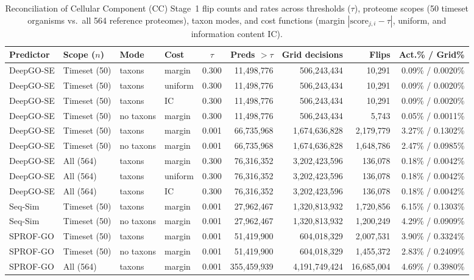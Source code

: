 \begin{table}[!h]
\centering
\caption{Reconciliation of Cellular Component (CC) Stage~1 flip counts and rates across thresholds ($\tau$), proteome scopes (50 timeset organisms vs.\ all 564 reference proteomes), taxon modes, and cost functions (margin $|\text{score}_{j,i}-\tau|$, uniform, and information content IC).}
\label{tab:supp-reconcile}
\scriptsize
\setlength{\tabcolsep}{3.5pt}
\renewcommand{\arraystretch}{0.94}
\begin{tabular}{llllc rrrr}
\toprule
Predictor & Scope ($n$) & Mode & Cost & $\tau$ & Preds $>\tau$ & Grid decisions & Flips & Act.\% / Grid\% \\
\midrule
DeepGO-SE & Timeset (50) & taxons    & margin  & 0.300 & 11{,}498{,}776 &   506{,}243{,}434 &    10{,}291 & 0.09\% / 0.0020\% \\
DeepGO-SE & Timeset (50) & taxons    & uniform & 0.300 & 11{,}498{,}776 &   506{,}243{,}434 &    10{,}291 & 0.09\% / 0.0020\% \\
DeepGO-SE & Timeset (50) & taxons    & IC      & 0.300 & 11{,}498{,}776 &   506{,}243{,}434 &    10{,}291 & 0.09\% / 0.0020\% \\
DeepGO-SE & Timeset (50) & no taxons & margin  & 0.300 & 11{,}498{,}776 &   506{,}243{,}434 &     5{,}743 & 0.05\% / 0.0011\% \\
DeepGO-SE & Timeset (50) & taxons    & margin  & 0.001 & 66{,}735{,}968 & 1{,}674{,}636{,}828 & 2{,}179{,}779 & 3.27\% / 0.1302\% \\
DeepGO-SE & Timeset (50) & no taxons & margin  & 0.001 & 66{,}735{,}968 & 1{,}674{,}636{,}828 & 1{,}648{,}786 & 2.47\% / 0.0985\% \\
DeepGO-SE & All (564)    & taxons    & margin  & 0.300 & 76{,}316{,}352 & 3{,}202{,}423{,}596 &   136{,}078 & 0.18\% / 0.0042\% \\
DeepGO-SE & All (564)    & taxons    & uniform & 0.300 & 76{,}316{,}352 & 3{,}202{,}423{,}596 &   136{,}078 & 0.18\% / 0.0042\% \\
DeepGO-SE & All (564)    & taxons    & IC      & 0.300 & 76{,}316{,}352 & 3{,}202{,}423{,}596 &   136{,}078 & 0.18\% / 0.0042\% \\
\midrule
Seq-Sim   & Timeset (50) & taxons    & margin  & 0.001 & 27{,}962{,}467 & 1{,}320{,}813{,}932 & 1{,}720{,}856 & 6.15\% / 0.1303\% \\
Seq-Sim   & Timeset (50) & no taxons & margin  & 0.001 & 27{,}962{,}467 & 1{,}320{,}813{,}932 & 1{,}200{,}249 & 4.29\% / 0.0909\% \\
SPROF-GO  & Timeset (50) & taxons    & margin  & 0.001 & 51{,}419{,}900 &   604{,}018{,}329 & 2{,}007{,}531 & 3.90\% / 0.3324\% \\
SPROF-GO  & Timeset (50) & no taxons & margin  & 0.001 & 51{,}419{,}900 &   604{,}018{,}329 & 1{,}455{,}372 & 2.83\% / 0.2409\% \\
SPROF-GO  & All (564)    & taxons    & margin  & 0.001 & 355{,}459{,}939 & 4{,}191{,}749{,}424 & 16{,}685{,}004 & 4.69\% / 0.3980\% \\
\bottomrule
\end{tabular}
\end{table}
